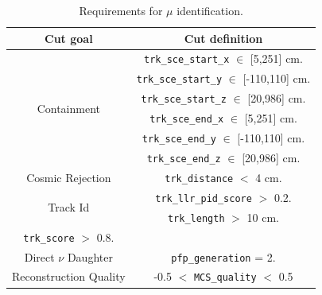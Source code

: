 \begin{table}[h!]
\centering
\setlength{\tabcolsep}{10pt}
\renewcommand{\arraystretch}{1.25}
 \begin{tabular}{| c | c |} 
 \hline
 Cut goal & Cut definition \\
 \hline\hline
\multirow{6}{*}{ Containment } &
     \texttt{trk\_sce\_start\_x} $\in$ [5,251] cm. \\&
     \texttt{trk\_sce\_start\_y} $\in$ [-110,110] cm.\\&
     \texttt{trk\_sce\_start\_z} $\in$ [20,986] cm.\\&
     \texttt{trk\_sce\_end\_x} $\in$ [5,251] cm.\\&
     \texttt{trk\_sce\_end\_y} $\in$ [-110,110] cm.\\&
     \texttt{trk\_sce\_end\_z} $\in$ [20,986] cm.\\
   \hline
 \multirow{1}{*}{ Cosmic Rejection } & \texttt{trk\_distance} $<$ 4 cm.\\
 \hline
 \multirow{2}{*}{ Track Id } &
     \texttt{trk\_llr\_pid\_score} $>$ 0.2.\\&
     \texttt{trk\_length} $>$ 10 cm.\\
     \texttt{trk\_score} $>$ 0.8.\\ 
     \hline
 \multirow{1}{*}{ Direct $\nu$ Daughter } &     
                    \texttt{pfp\_generation} = 2.\\
  \hline          
 \multirow{1}{*}{ Reconstruction Quality } & -0.5 $<$ \texttt{MCS\_quality} $<$ 0.5\\
  \hline
\end{tabular}
 \caption{\label{tab:findthemuon} Requirements for $\mu$ identification.}
\end{table}

